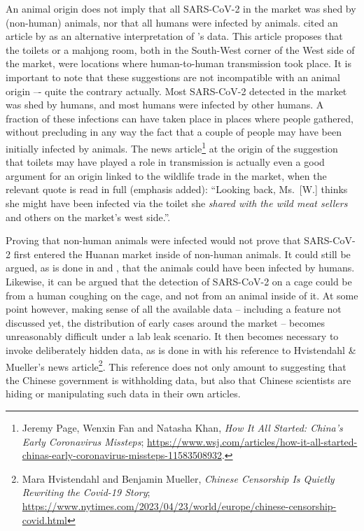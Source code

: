 \documentclass[11pt]{article}
\def \sct {\mbox{SARS-CoV-2}}
\begin{document}
An animal origin does not imply that all \sct{} in the market was shed by (non-human) animals, nor that all humans were infected by animals.  cited an article by \citet{CORibera2022ER} as an alternative interpretation of \citet{Liu2022RS}'s data. This article proposes that the toilets or a mahjong room, both in the South-West corner of the West side of the market, were locations where human-to-human transmission took place. It is important to note that these suggestions are not incompatible with an animal origin –- quite the contrary actually. Most \sct{} detected in the market was shed by humans, and most humans were infected by other humans. A fraction of these infections can have taken place in places where people gathered, without precluding in any way the fact that a couple of people may have been initially infected by animals. The news article\footnote{ 
Jeremy Page, Wenxin Fan and Natasha Khan, \textit{How It All Started: China's Early Coronavirus Missteps}; \url{https://www.wsj.com/articles/how-it-all-started-chinas-early-coronavirus-missteps-11583508932}.} at the origin of the suggestion that toilets may have played a role in transmission is actually even a good argument for an origin linked to the wildlife trade in the market, when the relevant quote is read in full (emphasis added): ``Looking back, Ms.\ [W.] thinks she might have been infected via the toilet she \textit{shared with the wild meat sellers} and others on the market's west side.''.

Proving that non-human animals were infected would not prove that \sct{} first entered the Huanan market inside of non-human animals. It could still be argued, as is done in \citet{Liu2023Nature} and \citet{Bloom2023VE}, that the animals could have been infected by humans. Likewise, it can be argued that the detection of \sct{} on a cage could be from a human coughing on the cage, and not from an animal inside of it. At some point however, making sense of all the available data -- including a feature not discussed yet, the distribution of early cases around the market \citep{Worobey2022Science} -- becomes unreasonably difficult under a lab leak scenario. It then becomes necessary to invoke deliberately hidden data, as is done in \citet{Bloom2023VE} with his reference to Hvistendahl \& Mueller's news article\footnote{Mara Hvistendahl and Benjamin Mueller, \textit{Chinese Censorship Is Quietly Rewriting the Covid-19 Story}; \url{https://www.nytimes.com/2023/04/23/world/europe/chinese-censorship-covid.html}}. This reference does not only amount to suggesting that the Chinese government is withholding data, but also that Chinese scientists are hiding or manipulating such data in their own articles. 
\end{document}
